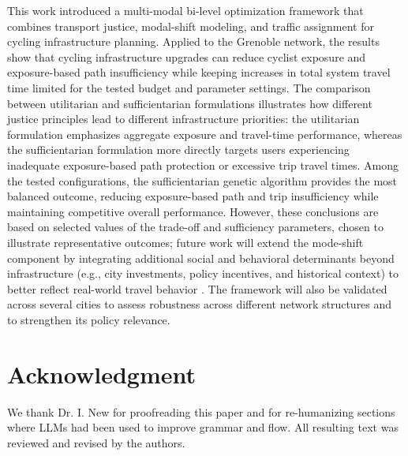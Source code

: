 \documentclass[lettersize,journal]{IEEEtran}
\begin{document}
This work introduced a multi-modal bi-level optimization framework that combines transport justice, modal-shift modeling, and traffic assignment for cycling infrastructure planning. Applied to the Grenoble network, the results show that cycling infrastructure upgrades can reduce cyclist exposure and exposure-based path insufficiency while keeping increases in total system travel time limited for the tested budget and parameter settings. The comparison between utilitarian and sufficientarian formulations illustrates how different justice principles lead to different infrastructure priorities: the utilitarian formulation emphasizes aggregate exposure and travel-time performance, whereas the sufficientarian formulation more directly targets users experiencing inadequate exposure-based path protection or excessive trip travel times. Among the tested configurations, the sufficientarian genetic algorithm provides the most balanced outcome, reducing exposure-based path and trip insufficiency while maintaining competitive overall performance. However, these conclusions are based on selected values of the trade-off and sufficiency parameters, chosen to illustrate representative outcomes; future work will extend the mode-shift component by integrating additional social and behavioral determinants beyond infrastructure (e.g., city investments, policy incentives, and historical context) to better reflect real-world travel behavior \cite{glachant2024negotiating}. The framework will also be validated across several cities to assess robustness across different network structures and to strengthen its policy relevance.


\section*{Acknowledgment}
We thank Dr. I. New for proofreading this paper and
for re-humanizing sections where LLMs had been used to
improve grammar and flow. All resulting text was reviewed and revised by the authors.





\end{document}
